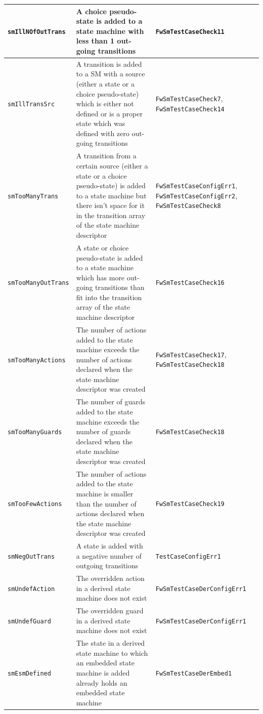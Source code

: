 \documentclass[a4paper,10pt]{article}
\begin{document}
\begin{longtable}{|p{3cm}|p{3.7cm}|p{4.5cm}|}
\hline
\texttt{smIllNOfOutTrans} & A choice pseudo-state is added to a state machine with less than 1 out-going transitions & \texttt{FwSmTestCaseCheck11} \\
\hline
\texttt{smIllTransSrc} & A transition is added to a SM with a source (either a state or a choice pseudo-state) which is either not defined or is 
a proper state which was defined with zero out-going transitions & \texttt{FwSmTestCaseCheck7}, \texttt{FwSmTestCaseCheck14} \\
\hline
\texttt{smTooManyTrans} & A transition from a certain source (either a state or a choice pseudo-state) is added to a state machine but there isn't 
space for it in the transition array of the state machine descriptor & \texttt{FwSmTestCaseConfigErr1}, \texttt{FwSmTestCaseConfigErr2}, 
\texttt{FwSmTestCaseCheck8} \\
\hline
\texttt{smTooManyOutTrans} & A state or choice pseudo-state is added to a state machine which has more out-going transitions than fit into 
the transition array of the state machine descriptor & \texttt{FwSmTestCaseCheck16} \\
\hline
\texttt{smTooManyActions} & The number of actions added to the state machine exceeds the number of actions declared when the state machine 
descriptor was created & \texttt{FwSmTestCaseCheck17}, \texttt{FwSmTestCaseCheck18} \\
\hline
\texttt{smTooManyGuards} & The number of guards added to the state machine exceeds the number of guards declared when the state machine 
descriptor was created & \texttt{FwSmTestCaseCheck18} \\
\hline
\texttt{smTooFewActions} & The number of actions added to the state machine is smaller than the number of actions declared when the state machine 
descriptor was created & \texttt{FwSmTestCaseCheck19} \\
\hline
\texttt{smNegOutTrans} & A state is added with a negative number of outgoing transitions & \texttt{TestCaseConfigErr1} \\
\hline
\texttt{smUndefAction} & The overridden action in a derived state machine does not exist & \texttt{FwSmTestCaseDerConfigErr1} \\
\hline
\texttt{smUndefGuard} & The overridden guard in a derived state machine does not exist & \texttt{FwSmTestCaseDerConfigErr1} \\
\hline
\texttt{smEsmDefined} & The state in a derived state machine to which an embedded state machine is added already holds an embedded state machine 
& \texttt{FwSmTestCaseDerEmbed1} \\

\end{longtable}
\end{document}
